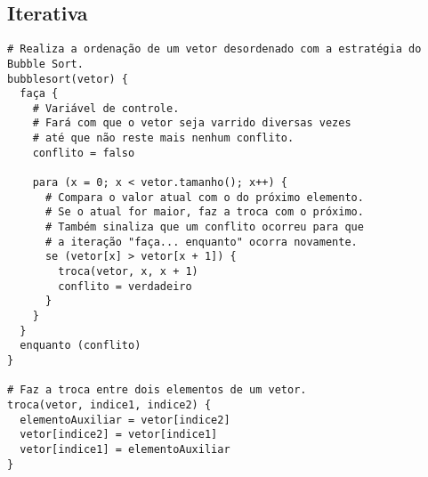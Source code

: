 \subsection{Iterativa}
\begin{verbatim}
# Realiza a ordenação de um vetor desordenado com a estratégia do Bubble Sort.
bubblesort(vetor) { 
  faça {
    # Variável de controle.
    # Fará com que o vetor seja varrido diversas vezes
    # até que não reste mais nenhum conflito.
    conflito = falso

    para (x = 0; x < vetor.tamanho(); x++) { 
      # Compara o valor atual com o do próximo elemento.
      # Se o atual for maior, faz a troca com o próximo.
      # Também sinaliza que um conflito ocorreu para que
      # a iteração "faça... enquanto" ocorra novamente.
      se (vetor[x] > vetor[x + 1]) {
        troca(vetor, x, x + 1)
        conflito = verdadeiro
      }
    }
  }
  enquanto (conflito)
}

# Faz a troca entre dois elementos de um vetor.
troca(vetor, indice1, indice2) { 
  elementoAuxiliar = vetor[indice2]
  vetor[indice2] = vetor[indice1]
  vetor[indice1] = elementoAuxiliar
}
\end{verbatim}
